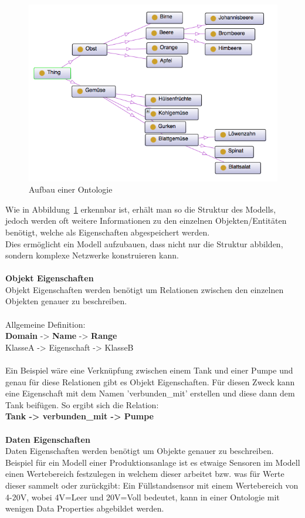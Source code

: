 \begin{figure}[hbt!]
  \centering
  \includegraphics[width=1\textwidth]{graphics/stateoftheart/Ontology_example}
  \caption{Aufbau einer Ontologie}
	\label{fig:Ontology_Aufbau}
\end{figure}

Wie in Abbildung~\ref{fig:Ontology_Aufbau} erkennbar ist, erhält man so die Struktur des Modells, jedoch werden oft weitere Informationen zu den einzelnen Objekten/Entitäten benötigt, welche als Eigenschaften abgespeichert werden.\\
Dies ermöglicht ein Modell aufzubauen, dass nicht nur die Struktur abbilden, sondern komplexe Netzwerke konstruieren kann.\\
\\
\noindent \textbf{Objekt Eigenschaften}\\
Objekt Eigenschaften werden benötigt um Relationen zwischen den einzelnen Objekten genauer zu beschreiben.\\
\\
Allgemeine Definition:\\
\textbf{Domain} -> \textbf{Name} -> \textbf{Range}\\
KlasseA -> Eigenschaft -> KlasseB\\
\\
Ein Beispiel wäre eine Verknüpfung zwischen einem Tank und einer Pumpe und genau für diese Relationen gibt es Objekt Eigenschaften. Für diesen Zweck kann eine Eigenschaft mit dem Namen 'verbunden\_mit' erstellen und diese dann dem Tank beifügen. So ergibt sich die Relation:\\
\textbf{Tank -> verbunden\_mit -> Pumpe}
\\
\\
\textbf{Daten Eigenschaften}\\
Daten Eigenschaften werden benötigt um Objekte genauer zu beschreiben. 
\\
Beispiel für ein Modell einer Produktionsanlage ist es etwaige Sensoren im Modell einen Wertebereich festzulegen in welchem dieser arbeitet bzw. was für Werte dieser sammelt oder zurückgibt: Ein Füllstandsensor mit einem Wertebereich von 4-20V, wobei 4V=Leer und 20V=Voll bedeutet, kann in einer Ontologie mit wenigen Data Properties abgebildet werden.

